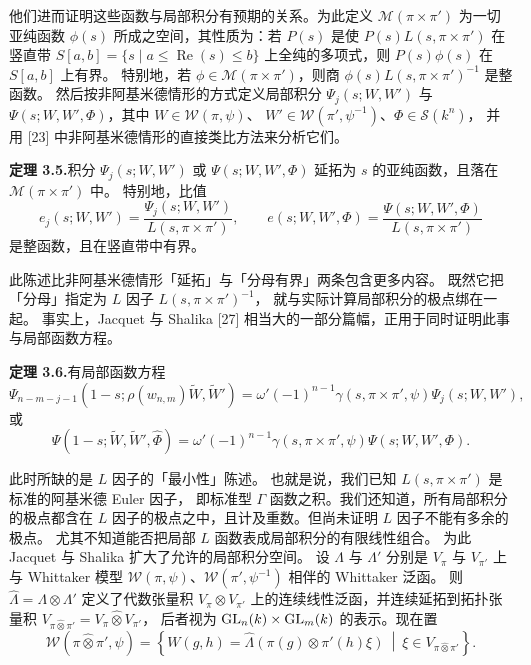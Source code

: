 他们进而证明这些函数与局部积分有预期的关系。为此定义 $\mathcal{M}(\pi\times\pi')$
为一切亚纯函数 $\phi(s)$ 所成之空间，其性质为：若 $P(s)$ 是使
$P(s)L(s,\pi\times\pi')$ 在竖直带 $S[a,b]=\{s\mid a\le\operatorname{Re}(s)\le b\}$
上全纯的多项式，则 $P(s)\phi(s)$ 在 $S[a,b]$ 上有界。
特别地，若 $\phi\in\mathcal{M}(\pi\times\pi')$，则商
$\phi(s)L(s,\pi\times\pi')^{-1}$ 是整函数。
然后按非阿基米德情形的方式定义局部积分 $\Psi_j(s;W,W')$ 与
$\Psi(s;W,W',\Phi)$，其中 $W\in\mathcal{W}(\pi,\psi)$、
$W'\in\mathcal{W}(\pi',\psi^{-1})$、$\Phi\in\mathcal{S}(k^n)$，
并用 [23] 中非阿基米德情形的直接类比方法来分析它们。

\textbf{定理 3.5.}\quad 积分 $\Psi_j(s;W,W')$ 或 $\Psi(s;W,W',\Phi)$ 延拓为
$s$ 的亚纯函数，且落在 $\mathcal{M}(\pi\times\pi')$ 中。
特别地，比值
\[
e_j(s;W,W')=\frac{\Psi_j(s;W,W')}{L(s,\pi\times\pi')},
\qquad
e(s;W,W',\Phi)=\frac{\Psi(s;W,W',\Phi)}{L(s,\pi\times\pi')}
\]
是整函数，且在竖直带中有界。

此陈述比非阿基米德情形「延拓」与「分母有界」两条包含更多内容。
既然它把「分母」指定为 $L$ 因子 $L(s,\pi\times\pi')^{-1}$，
就与实际计算局部积分的极点绑在一起。
事实上，Jacquet 与 Shalika [27] 相当大的一部分篇幅，正用于同时证明此事
与局部函数方程。

\textbf{定理 3.6.}\quad 有局部函数方程
\[
\Psi_{n-m-j-1}(1-s;\rho(w_{n,m})\widetilde{W},\widetilde{W}')
=\omega'(-1)^{n-1}\gamma(s,\pi\times\pi',\psi)\Psi_j(s;W,W'),
\]
或
\[
\Psi(1-s;\widetilde{W},\widetilde{W}',\widehat{\Phi})
=\omega'(-1)^{n-1}\gamma(s,\pi\times\pi',\psi)\Psi(s;W,W',\Phi).
\]

此时所缺的是 $L$ 因子的「最小性」陈述。
也就是说，我们已知 $L(s,\pi\times\pi')$ 是标准的阿基米德 Euler 因子，
即标准型 $\Gamma$ 函数之积。我们还知道，所有局部积分的极点都含在
$L$ 因子的极点之中，且计及重数。但尚未证明 $L$ 因子不能有多余的极点。
尤其不知道能否把局部 $L$ 函数表成局部积分的有限线性组合。
为此 Jacquet 与 Shalika 扩大了允许的局部积分空间。
设 $\Lambda$ 与 $\Lambda'$ 分别是 $V_\pi$ 与 $V_{\pi'}$ 上与 Whittaker 模型
$\mathcal{W}(\pi,\psi)$、$\mathcal{W}(\pi',\psi^{-1})$ 相伴的 Whittaker 泛函。
则 $\widehat{\Lambda}=\Lambda\otimes\Lambda'$ 定义了代数张量积
$V_\pi\otimes V_{\pi'}$ 上的连续线性泛函，并连续延拓到拓扑张量积
$V_{\pi\widehat{\otimes}\pi'}=V_\pi\widehat{\otimes}V_{\pi'}$，
后者视为 $\mathrm{GL}_n(k)\times\mathrm{GL}_m(k)$ 的表示。现在置
\[
\mathcal{W}(\pi\widehat{\otimes}\pi',\psi)
=\left\{W(g,h)=\widehat{\Lambda}(\pi(g)\otimes\pi'(h)\xi)\ \middle|\
\xi\in V_{\pi\widehat{\otimes}\pi'}\right\}.
\]

